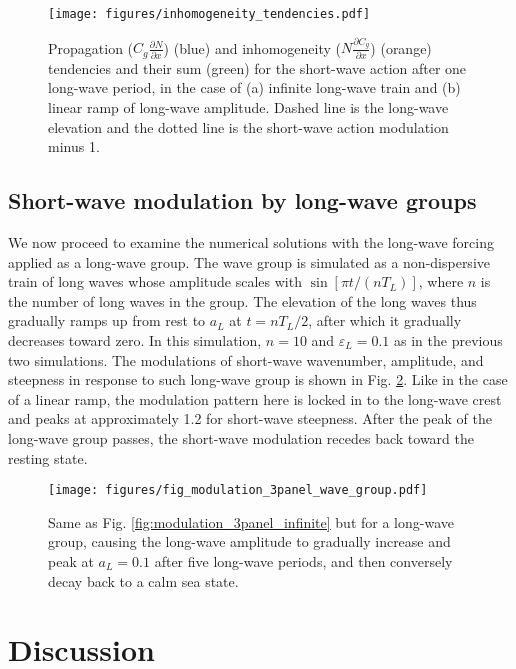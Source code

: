 \documentclass[lineno]{jfm}
\begin{document}
\begin{figure}
  \centering
  \texttt{[image: figures/inhomogeneity\_tendencies.pdf]}
  \caption{
    Propagation ($C_g \frac{\partial N}{\partial x}$) (blue) and inhomogeneity
    ($N \frac{\partial C_g}{\partial x}$) (orange) tendencies and their sum
    (green) for the short-wave action after one long-wave period, in the case of
    (a) infinite long-wave train and (b) linear ramp of long-wave amplitude.
    Dashed line is the long-wave elevation and the dotted line is the short-wave
    action modulation minus 1.
  }
  \label{fig:inhomogeneity_tendencies}
\end{figure}

\subsection{Short-wave modulation by long-wave groups}
\label{subsection:wave_groups}

We now proceed to examine the numerical solutions with the long-wave forcing
applied as a long-wave group.
The wave group is simulated as a non-dispersive train of long waves whose
amplitude scales with $\sin[\pi t / (n T_L)]$, where $n$ is the number of
long waves in the group.
The elevation of the long waves thus gradually ramps up from rest to $a_L$ at
$t = n T_L / 2$, after which it gradually decreases toward zero.
In this simulation, $n = 10$ and $\varepsilon_L = 0.1$ as in the previous two
simulations.
The modulations of short-wave wavenumber, amplitude, and steepness in response
to such long-wave group is shown in Fig. \ref{fig:modulation_3panel_groups}.
Like in the case of a linear ramp, the modulation pattern here is locked in to
the long-wave crest and peaks at approximately 1.2 for short-wave steepness.
After the peak of the long-wave group passes, the short-wave modulation recedes
back toward the resting state.

\begin{figure}
\centering
\texttt{[image: figures/fig\_modulation\_3panel\_wave\_group.pdf]}
\caption{
  Same as Fig. \ref{fig:modulation_3panel_infinite} but for a long-wave group,
  causing the long-wave amplitude to gradually increase and peak at $a_L = 0.1$
  after five long-wave periods, and then conversely decay back to a calm sea state.
}
\label{fig:modulation_3panel_groups}
\end{figure}

\section{Discussion}
\label{section:discussion}
\end{document}
